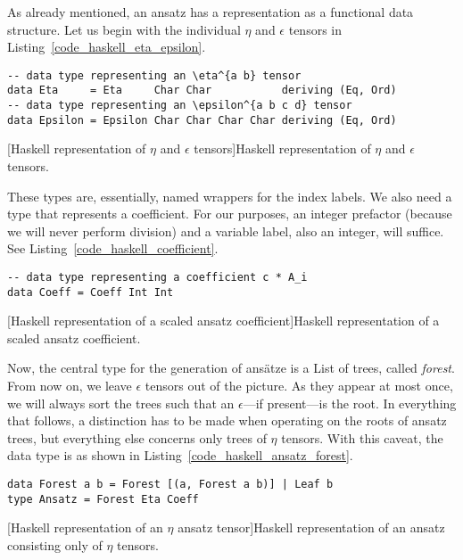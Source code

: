 As already mentioned, an ansatz has a representation as a functional data structure. Let us begin with the individual $\eta$ and $\epsilon$ tensors in Listing~\ref{code_haskell_eta_epsilon}.
\begin{code}
  \begin{verbatim}
-- data type representing an \eta^{a b} tensor
data Eta     = Eta     Char Char           deriving (Eq, Ord)
-- data type representing an \epsilon^{a b c d} tensor
data Epsilon = Epsilon Char Char Char Char deriving (Eq, Ord)
  \end{verbatim}
  [Haskell representation of $\eta$ and $\epsilon$ tensors]{Haskell representation of $\eta$ and $\epsilon$ tensors.}
  \label{code_haskell_eta_epsilon}
\end{code}
These types are, essentially, named wrappers for the index labels. We also need a type that represents a coefficient. For our purposes, an integer prefactor (because we will never perform division) and a variable label, also an integer, will suffice. See Listing~\ref{code_haskell_coefficient}.
\begin{code}
  \begin{verbatim}
-- data type representing a coefficient c * A_i
data Coeff = Coeff Int Int
  \end{verbatim}
  [Haskell representation of a scaled ansatz coefficient]{Haskell representation of a scaled ansatz coefficient.}
  \label{code_haskell_coefficient}
\end{code}
Now, the central type for the generation of ansätze is a List of trees, called \emph{forest}. From now on, we leave $\epsilon$ tensors out of the picture. As they appear at most once, we will always sort the trees such that an $\epsilon$---if present---is the root. In everything that follows, a distinction has to be made when operating on the roots of ansatz trees, but everything else concerns only trees of $\eta$ tensors. With this caveat, the data type is as shown in Listing~\ref{code_haskell_ansatz_forest}.
\begin{code}
  \begin{verbatim}
data Forest a b = Forest [(a, Forest a b)] | Leaf b
type Ansatz = Forest Eta Coeff
  \end{verbatim}
  [Haskell representation of an $\eta$ ansatz tensor]{Haskell representation of an ansatz consisting only of $\eta$ tensors.}
  \label{code_haskell_ansatz_forest}
\end{code}
